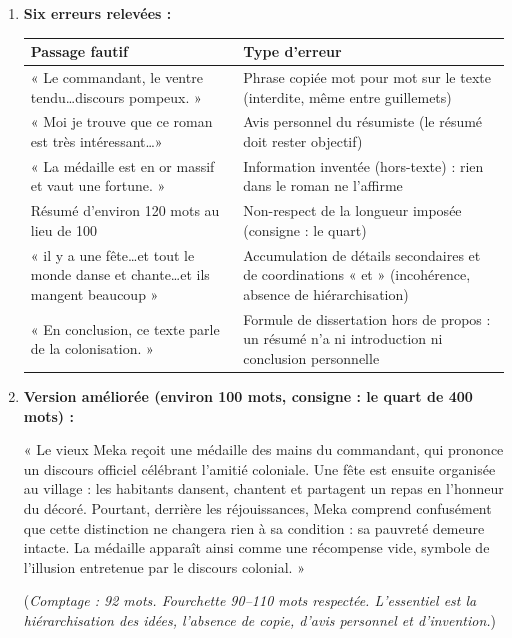 \documentclass[11pt]{article}
\begin{document}
\begin{corrige}
\begin{enumerate}
\item \textbf{Six erreurs relevées :}
\begin{center}
\begin{tabularx}{\linewidth}{|l|X|}\hline
\rowcolor{popblueL} \textbf{Passage fautif} & \textbf{Type d'erreur} \\ \hline
« Le commandant, le ventre tendu\ldots discours pompeux. » & Phrase copiée mot pour mot sur le texte (interdite, même entre guillemets) \\ \hline
« Moi je trouve que ce roman est très intéressant\ldots » & Avis personnel du résumiste (le résumé doit rester objectif) \\ \hline
« La médaille est en or massif et vaut une fortune. » & Information inventée (hors-texte) : rien dans le roman ne l'affirme \\ \hline
Résumé d'environ 120 mots au lieu de 100 & Non-respect de la longueur imposée (consigne : le quart) \\ \hline
« il y a une fête\ldots et tout le monde danse et chante\ldots et ils mangent beaucoup » & Accumulation de détails secondaires et de coordinations « et » (incohérence, absence de hiérarchisation) \\ \hline
« En conclusion, ce texte parle de la colonisation. » & Formule de dissertation hors de propos : un résumé n'a ni introduction ni conclusion personnelle \\ \hline
\end{tabularx}
\end{center}
\item \textbf{Version améliorée (environ 100 mots, consigne : le quart de 400 mots) :}

« Le vieux Meka reçoit une médaille des mains du commandant, qui prononce un discours officiel célébrant l'amitié coloniale. Une fête est ensuite organisée au village : les habitants dansent, chantent et partagent un repas en l'honneur du décoré. Pourtant, derrière les réjouissances, Meka comprend confusément que cette distinction ne changera rien à sa condition : sa pauvreté demeure intacte. La médaille apparaît ainsi comme une récompense vide, symbole de l'illusion entretenue par le discours colonial. »

(\emph{Comptage : 92 mots. Fourchette 90--110 mots respectée. L'essentiel est la hiérarchisation des idées, l'absence de copie, d'avis personnel et d'invention.})
\end{enumerate}
\end{corrige}
\end{document}

